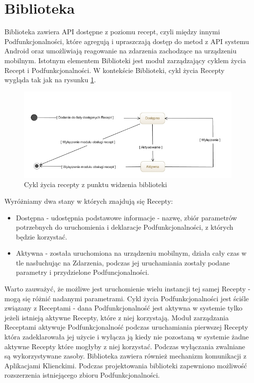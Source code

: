 \documentclass[11pt,a4paper,polish,thesis]{dcsbook}
\begin{document}
\section{Biblioteka}
Biblioteka zawiera API dostępne z poziomu recept, czyli między innymi Podfunkcjonalności, które agregują i upraszczają dostęp do metod z API systemu Android oraz umożliwiają reagowanie na zdarzenia zachodzące na urządzeniu mobilnym.
Istotnym elementem Biblioteki jest moduł zarządzający cyklem życia Recept i Podfunkcjonalności. W kontekście Biblioteki, cykl życia Recepty wygląda tak jak na rysunku
\ref{fig:cykl-zycia-recepty}.
\begin{figure}[H]
  \centering
  \includegraphics[scale=0.6]{./resources/cykl-zycia-recepty.jpg}
  \caption{Cykl życia recepty z punktu widzenia biblioteki}
  \label{fig:cykl-zycia-recepty}
\end{figure}
Wyróżniamy dwa stany w których znajdują się Recepty:
\begin{itemize}
\item Dostępna - udostępnia podstawowe informacje - nazwę, zbiór parametrów potrzebnych do uruchomienia i deklaracje Podfunkcjonalności, z których będzie korzystać.
\item Aktywna - została uruchomiona na urządzeniu mobilnym, działa cały czas w tle nasłuchując na Zdarzenia, podczas jej uruchamiania zostały podane parametry i przydzielone Podfuncjonalności.
\end{itemize}
Warto zauważyć, że możliwe jest uruchomienie wielu instancji tej samej Recepty - mogą się różnić nadanymi parametrami.
Cykl życia Podfunkcjonalności jest ściśle związany z Receptami - dana Podfunkcjonalność jest aktywna w systemie tylko jeżeli istnieją aktywne Recepty, które z niej korzystają. 
Moduł zarządzania Receptami aktywuje Podfunkcjonalność podczas uruchamiania pierwszej Recepty która zadeklarowała jej użycie i wyłącza ją kiedy nie pozostaną w systemie żadne aktywne Recepty które mogłyby z niej korzystać.
Podczas wyłączania zwalniane są wykorzystywane zasoby. Biblioteka zawiera również mechanizm komunikacji z Aplikacjami Klienckimi. Podczas projektowania biblioteki zapewniono możliwość rozszerzenia istniejącego zbioru Podfunkcjonalności.
\end{document}
